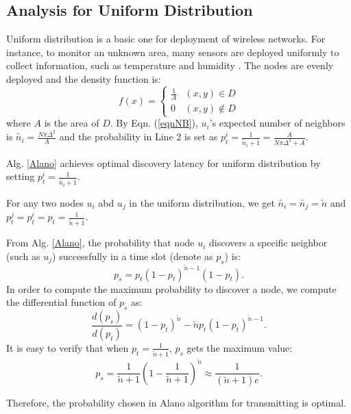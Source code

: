 \subsection{Analysis for Uniform Distribution}
\label{uniform}
Uniform distribution is a basic one for deployment of wireless networks.
For instance, to monitor an unknown area, many sensors are deployed uniformly to collect information, such as temperature and humidity \cite{flammini2007real}. The nodes are evenly deployed and the density function is:
$$f(x)=
\begin{cases}
\frac{1}{A}& (x,y)\in D\\
0& (x,y)\notin D
\end{cases}$$
where $A$ is the area of $D$.
By Eqn. (\ref{eqnNB}), $u_i$'s expected number of neighbors is $\widetilde{n_i} = \frac{N\pi \Delta^2}{A}$ and the probability in Line 2 is set as $p_t^i = \frac{1}{\widetilde{n_i}+1}=\frac{A}{N\pi \Delta^2+A}$. 
\begin{lemma}
Alg. \ref{Alano} achieves optimal discovery latency for uniform distribution by setting $p_t^i = \frac{1}{\widetilde{n_i}+1}$.
\end{lemma}
\begin{IEEEproof}
For any two nodes $u_i$ abd $u_j$ in the uniform distribution, we get $\widetilde{n_i} = \widetilde{n_j} = \widetilde{n}$ and $p_t^j = p_t^ i = p_t = \frac{1}{\widetilde{n}+1}$.



From Alg. \ref{Alano}, the probability that node $u_i$ discovers a specific neighbor (such as $u_j$) successfully in a time slot (denote as $p_s$) is:
$$
p_s = p_t{(1-p_t)}^{\widetilde{n}-1}(1-p_t).
$$
In order to compute the maximum probability to discover a node, we compute the differential function of $p_s$ as:
$$
\frac{d(p_s)}{d(p_t)} = {(1-p_t)}^{\widetilde{n}}-\widetilde{n}p_t{(1-p_t)}^{\widetilde{n}-1}.
$$
It is easy to verify that when $p_t=\frac{1}{\widetilde{n}+1}$, $p_s$ gets the maximum value:
$$p_s = \frac{1}{\widetilde{n}+1}{(1-\frac{1}{\widetilde{n}+1})}^{\widetilde{n}} \approx \frac{1}{(\widetilde{n}+1)e}.$$

Therefore, the probability chosen in Alano algorithm for transmitting is optimal.
\end{IEEEproof}



